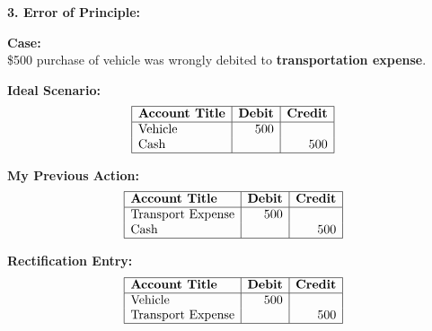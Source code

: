 \documentclass[12pt,a4paper]{book}
\begin{document}
\textbf{3. Error of Principle:}
\begin{multicols}{2}
\textbf{Case:} \\
\$500 purchase of vehicle was wrongly debited to \textbf{transportation expense}.

\textbf{Ideal Scenario:}
\[
\begin{array}{|l|r|r|}
\hline
\textbf{Account Title} & \textbf{Debit} & \textbf{Credit} \\
\hline
\text{Vehicle} & 500 & \\
\text{Cash} & & 500 \\
\hline
\end{array}
\]

\textbf{My Previous Action:}
\[
\begin{array}{|l|r|r|}
\hline
\textbf{Account Title} & \textbf{Debit} & \textbf{Credit} \\
\hline
\text{Transport Expense} & 500 & \\
\text{Cash} & & 500 \\
\hline
\end{array}
\]

\textbf{Rectification Entry:}
\[
\begin{array}{|l|r|r|}
\hline
\textbf{Account Title} & \textbf{Debit} & \textbf{Credit} \\
\hline
\text{Vehicle} & 500 & \\
\text{Transport Expense} & & 500 \\
\hline
\end{array}
\]
\end{multicols} 
\vspace{0.5cm}
\end{document}
